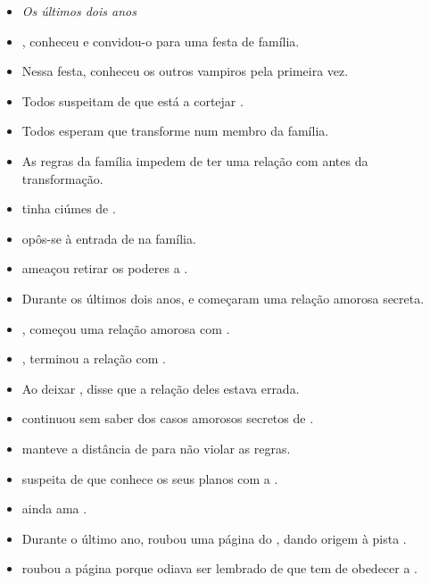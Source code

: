 \begin{itemize}
  \item[] \textit{Os últimos dois anos}

  \item {},  conheceu  e convidou-o para uma festa de família.
  \item Nessa festa,  conheceu os outros vampiros pela primeira vez.
  \item Todos suspeitam de que  está a cortejar .
  \item Todos esperam que  transforme  num membro da família.
  \item As regras da família impedem  de ter uma relação com  antes da transformação.
  \item {} tinha ciúmes de .
  \item {} opôs-se à entrada de  na família.
  \item {} ameaçou retirar os poderes a .
  \item Durante os últimos dois anos,  e  começaram uma relação amorosa secreta.
  \item {},  começou uma relação amorosa com .
  \item {},  terminou a relação com .
  \item Ao deixar ,  disse que a relação deles estava errada.
  \item {} continuou sem saber dos casos amorosos secretos de .
  \item {} manteve a distância de  para não violar as regras.
  \item {} suspeita de que  conhece os seus planos com a .
  \item {} ainda ama .
  \item Durante o último ano,  roubou uma página do , dando origem à pista .
  \item {} roubou a página porque odiava ser lembrado de que tem de obedecer a .

\end{itemize}
